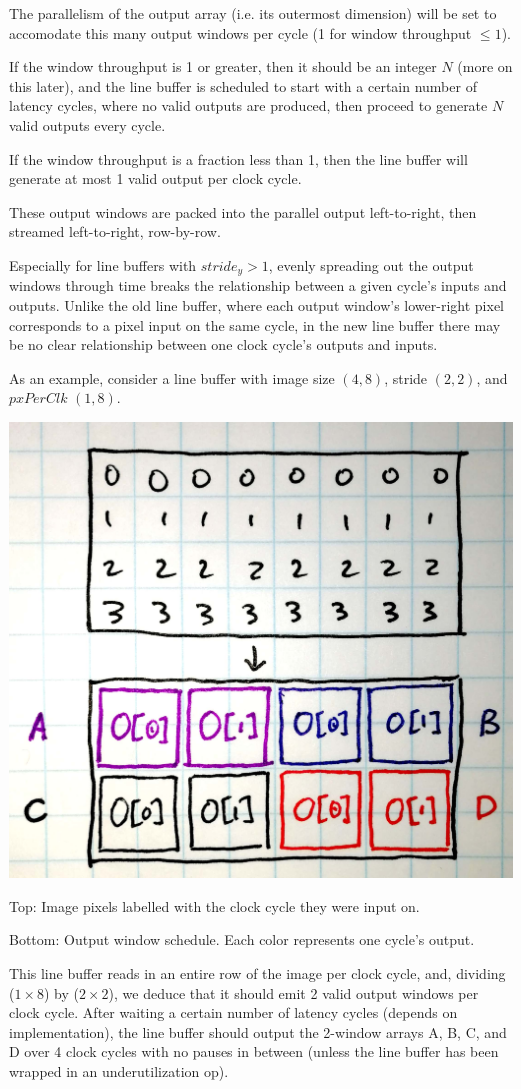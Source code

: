 \documentclass[12pt]{article}
\begin{document}
The parallelism of the output array (i.e. its outermost dimension)
will be set to accomodate this many output windows per cycle (1 for
window throughput $\le1$).

If the window throughput is 1 or greater, then it should be an integer
$N$ (more on this later), and the line buffer is scheduled to start
with a certain number of latency cycles, where no valid outputs are
produced, then proceed to generate $N$ valid outputs every cycle.

If the window throughput is a fraction less than 1, then the line
buffer will generate at most 1 valid output per clock cycle.

These output windows are packed into the parallel output left-to-right,
then streamed left-to-right, row-by-row.

Especially for line buffers with $stride_y > 1$, evenly spreading out
the output windows through time breaks the relationship between a
given cycle's inputs and outputs. Unlike the old line buffer, where
each output window's lower-right pixel corresponds to a pixel input on
the same cycle, in the new line buffer there may be no clear
relationship between one clock cycle's outputs and inputs.

As an example, consider a line buffer with image size $(4,8)$,
stride $(2,2)$, and $pxPerClk$ $(1,8)$.

\begin{center}
\includegraphics[width=0.6\linewidth]{Figures/lb-schedule.jpg}

Top: Image pixels labelled with the clock cycle they were input on.

Bottom: Output window schedule. Each color represents one cycle's output.
\end{center}

This line buffer reads in an entire row of the image per clock cycle,
and, dividing ($1\times 8$) by ($2\times 2$), we deduce that it should
emit 2 valid output windows per clock cycle. After waiting a certain
number of latency cycles (depends on implementation), the line buffer
should output the 2-window arrays A, B, C, and D over 4 clock cycles
with no pauses in between (unless the line buffer has been wrapped in
an underutilization op).
\end{document}
